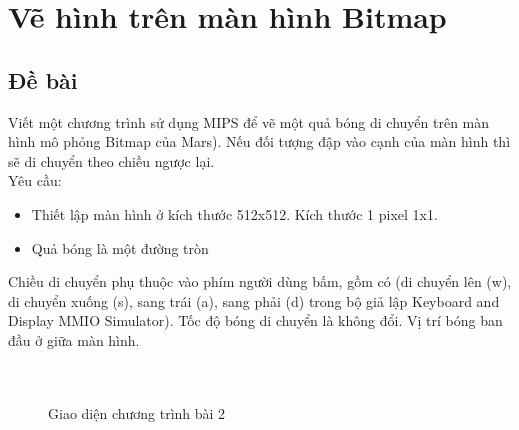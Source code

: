 \documentclass[a4paper,12pt]{article}
\begin{document}
	
	
	
	
	
	
	
	
	
	
	
	
	
	
	\clearpage
	\section{Vẽ hình trên màn hình Bitmap}
	\subsection{Đề bài}
	Viết một chương trình sử dụng MIPS để vẽ một quả bóng di chuyển trên màn hình mô phỏng Bitmap của Mars). Nếu đối tượng đập vào cạnh của màn hình thì sẽ di chuyển theo chiều ngược lại. \\
	Yêu cầu:
	\begin{itemize}
		\item Thiết lập màn hình ở kích thước 512x512. Kích thước 1 pixel 1x1.
		\item Quả bóng là một đường tròn
	\end{itemize}
	Chiều di chuyển phụ thuộc vào phím người dùng bấm, gồm có (di chuyển lên (w), di chuyển xuống (s), sang trái (a), sang phải (d) trong bộ giả lập Keyboard and Display MMIO Simulator). Tốc độ bóng di chuyển là không đổi. Vị trí bóng ban đầu ở giữa màn hình.
	\\ \\ \\ 
	\begin{figure}[!h]
    	\centerline{}
    	\caption{Giao diện chương trình bài 2}
    	\label{fig:bai6}
    \end{figure}
	\clearpage
\end{document}
